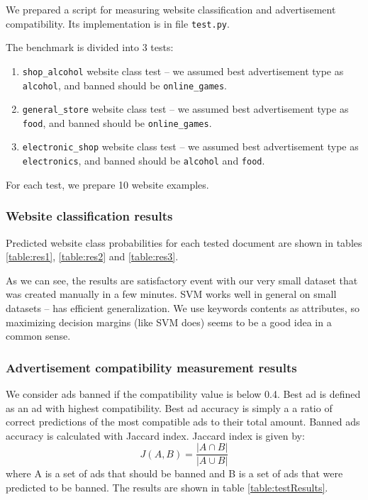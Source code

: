 \documentclass[a4paper]{article}
\begin{document}
We prepared a script for measuring website classification and
advertisement compatibility.
Its implementation is in file \texttt{test.py}.

The benchmark is divided into 3 tests:
\begin{enumerate}
    \item \texttt{shop\_alcohol} website class test --
        we assumed best advertisement type as \texttt{alcohol},
        and banned should be \texttt{online\_games}.
    \item \texttt{general\_store} website class test --
        we assumed best advertisement type as \texttt{food},
        and banned should be \texttt{online\_games}.
    \item \texttt{electronic\_shop} website class test --
        we assumed best advertisement type as \texttt{electronics},
        and banned should be \texttt{alcohol} and \texttt{food}.
\end{enumerate}
For each test, we prepare 10 website examples.


\subsubsection {Website classification results}
Predicted website class probabilities for each tested document are shown in
tables
\ref{table:res1},
\ref{table:res2} and
\ref{table:res3}.

As we can see, the results are satisfactory event with our very small dataset
that was created manually in a few minutes.
SVM works well in general on small datasets -- has efficient generalization.
We use keywords contents as attributes, so maximizing decision margins (like SVM does)
seems to be a good idea in a common sense.

\subsubsection {Advertisement compatibility measurement results}
We consider ads banned if the compatibility value is below 0.4.
Best ad is defined as an ad with highest compatibility.
Best ad accuracy is simply a a ratio of correct predictions
of the most compatible ads to their total amount.
Banned ads accuracy is calculated with Jaccard index.
Jaccard index is given by:
\begin{equation}
    J(A,B) = \frac{|A\cap B|}{|A\cup B|}
\end{equation}
where A is a set of ads that should be banned and B is a set of ads that were predicted to be banned.
The results are shown in table \ref{table:testResults}.
\end{document}
